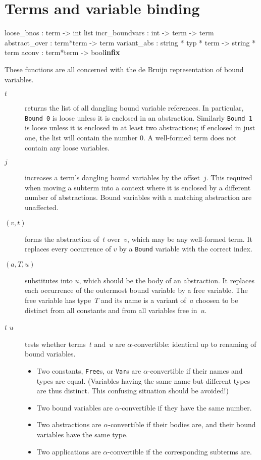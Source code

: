 \section{Terms and variable binding}
\begin{ttbox}
loose_bnos     : term -> int list
incr_boundvars : int -> term -> term
abstract_over  : term*term -> term
variant_abs    : string * typ * term -> string * term
aconv          : term*term -> bool\hfill{\bf infix}
\end{ttbox}
These functions are all concerned with the de Bruijn representation of
bound variables.
\begin{description}
\item[ $t$] 
  returns the list of all dangling bound variable references.  In
  particular, {\tt Bound~0} is loose unless it is enclosed in an
  abstraction.  Similarly {\tt Bound~1} is loose unless it is enclosed in
  at least two abstractions; if enclosed in just one, the list will contain
  the number 0.  A well-formed term does not contain any loose variables.

\item[ $j$] 
  increases a term's dangling bound variables by the offset~$j$.  This
  required when moving a subterm into a context where it is enclosed by a
  different number of abstractions.  Bound variables with a matching
  abstraction are unaffected.

\item[ $(v,t)$] 
  forms the abstraction of~$t$ over~$v$, which may be any well-formed term.
  It replaces every occurrence of \(v\) by a {\tt Bound} variable with the
  correct index.

\item[ $(a,T,u)$] 
  substitutes into $u$, which should be the body of an abstraction.
  It replaces each occurrence of the outermost bound variable by a free
  variable.  The free variable has type~$T$ and its name is a variant
  of~$a$ choosen to be distinct from all constants and from all variables
  free in~$u$.

\item[$t$  $u$] 
  tests whether terms~$t$ and~$u$ are \(\alpha\)-convertible: identical up
  to renaming of bound variables.
\begin{itemize}
  \item
    Two constants, {\tt Free}s, or {\tt Var}s are \(\alpha\)-convertible
    if their names and types are equal.
    (Variables having the same name but different types are thus distinct.
    This confusing situation should be avoided!)
  \item
    Two bound variables are \(\alpha\)-convertible
    if they have the same number.
  \item
    Two abstractions are \(\alpha\)-convertible
    if their bodies are, and their bound variables have the same type.
  \item
    Two applications are \(\alpha\)-convertible
    if the corresponding subterms are.
\end{itemize}

\end{description}


